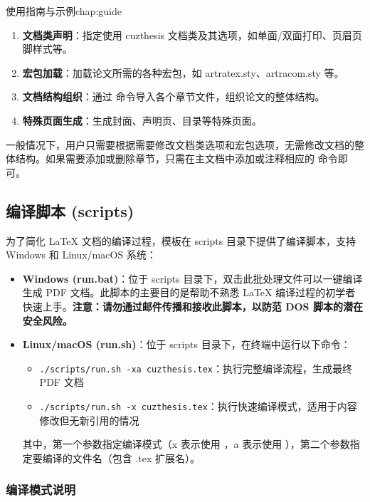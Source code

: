 \begin{cuzchapter}{使用指南与示例}{chap:guide}
    \begin{enumerate}
        \item \textbf{文档类声明}：指定使用 cuzthesis 文档类及其选项，如单面/双面打印、页眉页脚样式等。
        \item \textbf{宏包加载}：加载论文所需的各种宏包，如 artratex.sty、artracom.sty 等。
        \item \textbf{文档结构组织}：通过 \verb|| 命令导入各个章节文件，组织论文的整体结构。
        \item \textbf{特殊页面生成}：生成封面、声明页、目录等特殊页面。
    \end{enumerate}

    一般情况下，用户只需要根据需要修改文档类选项和宏包选项，无需修改文档的整体结构。如果需要添加或删除章节，只需在主文档中添加或注释相应的 \verb|| 命令即可。

    \subsection{编译脚本 (scripts)}\label{sub:scripts}

    为了简化 \LaTeX{} 文档的编译过程，模板在 scripts 目录下提供了编译脚本，支持 Windows 和 Linux/macOS 系统：

    \begin{itemize}
        \item \textbf{Windows (run.bat)}：位于 scripts 目录下，双击此批处理文件可以一键编译生成 PDF 文档。此脚本的主要目的是帮助不熟悉 \LaTeX{} 编译过程的初学者快速上手。\textbf{注意：请勿通过邮件传播和接收此脚本，以防范 DOS 脚本的潜在安全风险。}

        \item \textbf{Linux/macOS (run.sh)}：位于 scripts 目录下，在终端中运行以下命令：
              \begin{itemize}
                  \item \verb|./scripts/run.sh -xa cuzthesis.tex|：执行完整编译流程，生成最终 PDF 文档
                  \item \verb|./scripts/run.sh -x cuzthesis.tex|：执行快速编译模式，适用于内容修改但无新引用的情况
              \end{itemize}

              其中，第一个参数指定编译模式（x 表示使用 ，a 表示使用 ），第二个参数指定要编译的文件名（包含 .tex 扩展名）。
    \end{itemize}

    \subsubsection{编译模式说明}


\end{cuzchapter}
